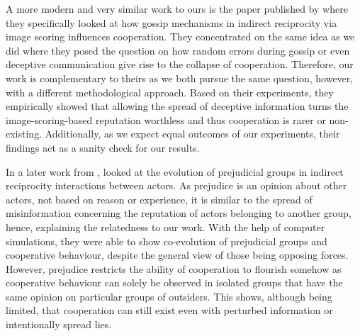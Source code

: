 \documentclass[sigconf]{acmart}
\begin{document}
    A more modern and very similar work to ours is the paper published by \citeauthor{szamado_deception_2016} \cite{szamado_deception_2016} where they specifically looked at how gossip mechanisms in indirect reciprocity via image scoring influences cooperation.
    They concentrated on the same idea as we did where they posed the question on how random errors during gossip or even deceptive communication give rise to the collapse of cooperation.
    Therefore, our work is complementary to theirs as we both pursue the same question, however, with a different methodological approach.
    Based on their experiments, they empirically showed that allowing the spread of deceptive information turns the image-scoring-based reputation worthless and thus cooperation is rarer or non-existing.
    Additionally, as we expect equal outcomes of our experiments, their findings act as a sanity check for our results.

    In a later work from \citeyear{whitaker_indirect_2018}, \citeauthor{whitaker_indirect_2018} \cite{whitaker_indirect_2018} looked at the evolution of prejudicial groups in indirect reciprocity interactions between actors.
    As prejudice is an opinion about other actors, not based on reason or experience, it is similar to the spread of misinformation concerning the reputation of actors belonging to another group, hence, explaining the relatedness to our work.
    With the help of computer simulations, they were able to show co-evolution of prejudicial groups and cooperative behaviour, despite the general view of those being opposing forces.
    However, prejudice restricts the ability of cooperation to flourish somehow as cooperative behaviour can solely be observed in isolated groups that have the same opinion on particular groups of outsiders.
    This shows, although being limited, that cooperation can still exist even with perturbed information or intentionally spread lies.
\end{document}

